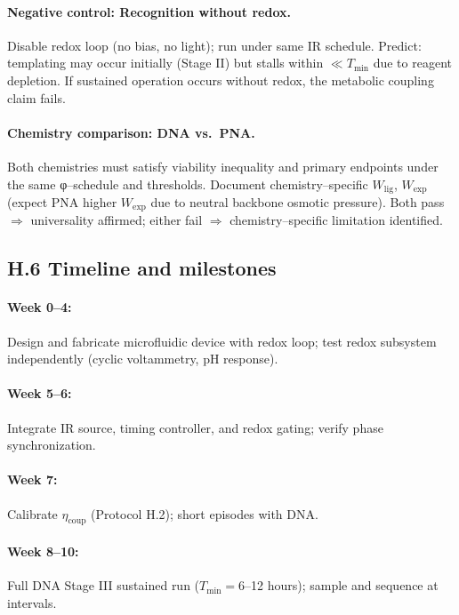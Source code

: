 \documentclass[11pt]{article}
\begin{document}
\paragraph{Negative control: Recognition without redox.}
Disable redox loop (no bias, no light); run under same IR schedule. Predict: templating may occur initially (Stage II) but stalls within $\ll T_{\min}$ due to reagent depletion. If sustained operation occurs without redox, the metabolic coupling claim fails.

\paragraph{Chemistry comparison: DNA vs.\ PNA.}
Both chemistries must satisfy viability inequality and primary endpoints under the same φ–schedule and thresholds. Document chemistry–specific $W_{\mathrm{lig}}$, $W_{\mathrm{exp}}$ (expect PNA higher $W_{\mathrm{exp}}$ due to neutral backbone osmotic pressure). Both pass $\Rightarrow$ universality affirmed; either fail $\Rightarrow$ chemistry–specific limitation identified.

\subsection*{H.6 Timeline and milestones}

\paragraph{Week 0–4:} Design and fabricate microfluidic device with redox loop; test redox subsystem independently (cyclic voltammetry, pH response).

\paragraph{Week 5–6:} Integrate IR source, timing controller, and redox gating; verify phase synchronization.

\paragraph{Week 7:} Calibrate $\eta_{\mathrm{coup}}$ (Protocol H.2); short episodes with DNA.

\paragraph{Week 8–10:} Full DNA Stage III sustained run ($T_{\min}=6$–12 hours); sample and sequence at intervals.
\end{document}
